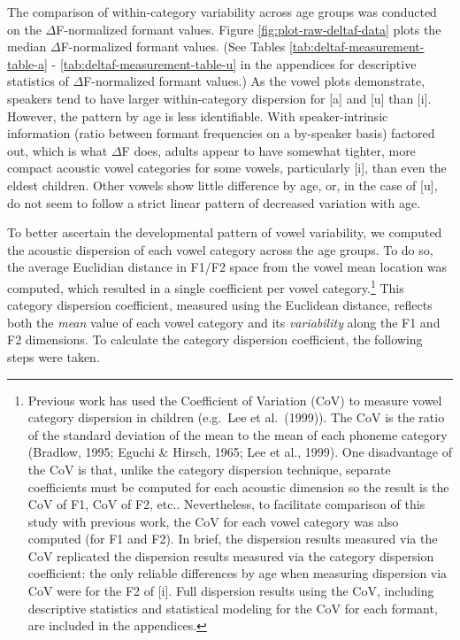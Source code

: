 \documentclass[
]{article}
\begin{document}
The comparison of within-category variability across age groups was conducted on the \(\Delta\)F-normalized formant values. Figure \ref{fig:plot-raw-deltaf-data} plots the median \(\Delta\)F-normalized formant values. (See Tables \ref{tab:deltaf-measurement-table-a} - \ref{tab:deltaf-measurement-table-u} in the appendices for descriptive statistics of \(\Delta\)F-normalized formant values.) As the vowel plots demonstrate, speakers tend to have larger within-category dispersion for {[}a{]} and {[}u{]} than {[}i{]}. However, the pattern by age is less identifiable. With speaker-intrinsic information (ratio between formant frequencies on a by-speaker basis) factored out, which is what \(\Delta\)F does, adults appear to have somewhat tighter, more compact acoustic vowel categories for some vowels, particularly {[}i{]}, than even the eldest children. Other vowels show little difference by age, or, in the case of {[}u{]}, do not seem to follow a strict linear pattern of decreased variation with age.

To better ascertain the developmental pattern of vowel variability, we computed the acoustic dispersion of each vowel category across the age groups. To do so, the average Euclidian distance in F1/F2 space from the vowel mean location was computed, which resulted in a single coefficient per vowel category.\footnote{Previous work has used the Coefficient of Variation (CoV) to measure vowel category dispersion in children (e.g.~Lee et al.~(1999)). The CoV is the ratio of the standard deviation of the mean to the mean of each phoneme category (Bradlow, 1995; Eguchi \& Hirsch, 1965; Lee et al., 1999). One disadvantage of the CoV is that, unlike the category dispersion technique, separate coefficients must be computed for each acoustic dimension so the result is the CoV of F1, CoV of F2, etc.. Nevertheless, to facilitate comparison of this study with previous work, the CoV for each vowel category was also computed (for F1 and F2). In brief, the dispersion results measured via the CoV replicated the dispersion results measured via the category dispersion coefficient: the only reliable differences by age when measuring dispersion via CoV were for the F2 of {[}i{]}. Full dispersion results using the CoV, including descriptive statistics and statistical modeling for the CoV for each formant, are included in the appendices.} This category dispersion coefficient, measured using the Euclidean distance, reflects both the \emph{mean} value of each vowel category and its \emph{variability} along the F1 and F2 dimensions. To calculate the category dispersion coefficient, the following steps were taken.
\end{document}
